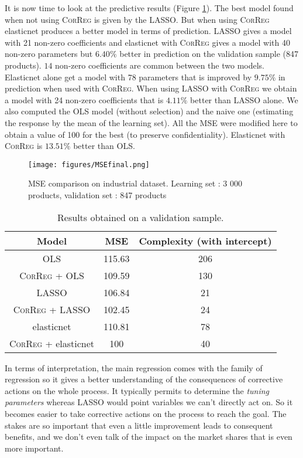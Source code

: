 \documentclass[11pt,a4paper]{article}
\begin{document}
			It is now time to look at the predictive results (Figure \ref{compareMSEexfos}).
				The best model found when not using \textsc{CorReg} is given by the LASSO. But when using \textsc{CorReg} elasticnet produces a better model in terms of prediction. LASSO gives a model with 21 non-zero coefficients and elasticnet with \textsc{CorReg} gives a model with 40 non-zero parameters but $6.40\%$ better in prediction on the validation sample (847 products). $14$ non-zero coefficients are common between the two models.
				Elasticnet alone get a model with 78 parameters that is improved by $9.75\%$ in prediction when used with \textsc{CorReg}. When using LASSO with \textsc{CorReg} we obtain a model with 24 non-zero coefficients that is $4.11\%$ better than LASSO alone. We also computed the OLS model (without selection) and the naive one (estimating the response by the mean of the learning set). All the MSE were modified here to obtain a value of 100 for the best (to preserve confidentiality). Elasticnet with \textsc{CorReg} is $13.51\%$ better than OLS.
		\begin{figure}[h]
			\centering
				\label{compareMSEexfos}
				\texttt{[image: figures/MSEfinal.png]}
			\caption{MSE comparison on industrial dataset. Learning set : 3 000 products, validation set : 847 products}
		\end{figure}		
		\begin{table}[h!]
\centering
\begin{tabular}{|c|c|c|}
	\hline 
	Model & MSE & Complexity (with intercept) \\ 
	\hline 
	OLS & 115.63 & 206 \\ 
	\hline 
	\textsc{CorReg} + OLS & 109.59&130 \\ 
	\hline  
	LASSO & 106.84 & 21 \\ 
	\hline 
	\textsc{CorReg} + LASSO & 102.45 &24 \\ 
	\hline 
	elasticnet & 110.81 & 78\\ 
	\hline 
	\textsc{CorReg} + elasticnet & 100 &40 \\ 
	\hline 
\end{tabular} 
\caption{Results obtained on a validation sample.}	
\end{table}

		In terms of interpretation, the main regression comes with the family of regression so it gives a better understanding of the consequences of corrective actions on the whole process. It typically permits to determine the \textit{tuning parameters} whereas LASSO would point variables we can't directly act on.	So it becomes easier to take corrective actions on the process to reach the goal. The stakes are so important that even a little improvement leads to consequent benefits, and we don't even talk of the impact on the market shares that is even more important.
		\clearpage
		
\end{document}
